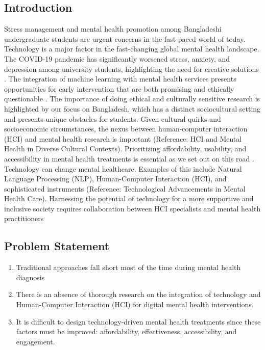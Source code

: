 \documentclass[a0,landscape]{a0poster}
\begin{document}
\begin{multicols}{4}
\color{SaddleBrown} %

\section*{Introduction}
Stress management and mental health promotion among Bangladeshi undergraduate students are urgent concerns in the fast-paced world of today. Technology is a major factor in the fast-changing global mental health landscape. The COVID-19 pandemic has significantly worsened stress, anxiety, and depression among university students, highlighting the need for creative solutions \cite{wang2020investigating}. The integration of machine learning with mental health services presents opportunities for early intervention that are both promising and ethically questionable \cite{thieme2020machine}. The importance of doing ethical and culturally sensitive research is highlighted by our focus on Bangladesh, which has a distinct sociocultural setting and presents unique obstacles for students. Given cultural quirks and socioeconomic circumstances, the nexus between human-computer interaction (HCI) and mental health research is important (Reference: HCI and Mental Health in Diverse Cultural Contexts). Prioritizing affordability, usability, and accessibility in mental health treatments is essential as we set out on this road \cite{zhang2022natural}. Technology can change mental healthcare. Examples of this include Natural Language Processing (NLP), Human-Computer Interaction (HCI), and sophisticated instruments (Reference: Technological Advancements in Mental Health Care). Harnessing the potential of technology for a more supportive and inclusive society requires collaboration between HCI specialists and mental health practitioners \cite{doherty2010design}






\subsection*{Problem Statement}
\begin{enumerate}
\itemsep-0.2em 
  \item Traditional approaches fall short most of the time during mental health diagnosis
  \item There is an absence of thorough research on the integration of technology and Human-Computer Interaction (HCI) for digital mental health interventions.
  \item It is difficult to design technology-driven mental health treatments since these factors must be improved: affordability, effectiveness, accessibility, and engagement.
\end{enumerate}


\end{multicols}
\end{document}
